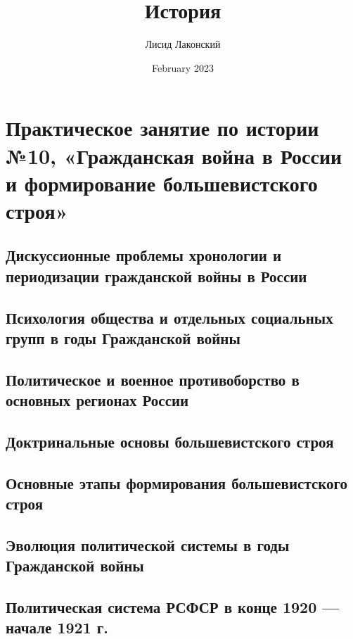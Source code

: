\documentclass{article}
\title{История}
\author{Лисид Лаконский}
\date{February 2023}
\begin{document}
\raggedright

\maketitle
\tableofcontents
\pagebreak

\section{Практическое занятие по истории №10, «Гражданская война в России и формирование большевистского строя»}

\subsection{Дискуссионные проблемы хронологии и периодизации гражданской войны в России}

\subsection{Психология общества и отдельных социальных групп в годы Гражданской войны}

\subsection{Политическое и военное противоборство в основных регионах России}

\subsection{Доктринальные основы большевистского строя}

\subsection{Основные этапы формирования большевистского строя}

\subsection{Эволюция политической системы в годы Гражданской войны}

\subsection{Политическая система РСФСР в конце 1920 — начале 1921 г.}
\end{document}
